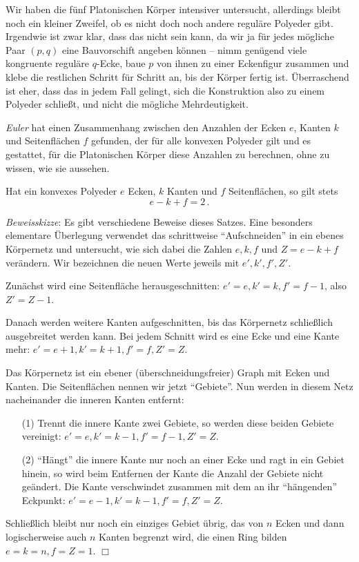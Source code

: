 \documentclass[11pt]{article}
\begin{document}
Wir haben die fünf Platonischen Körper intensiver untersucht, allerdings
bleibt noch ein kleiner Zweifel, ob es nicht doch noch andere reguläre
Polyeder gibt.  Irgendwie ist zwar klar, dass das nicht sein kann, da wir ja
für jedes mögliche Paar $(p,q)$ eine Bauvorschift angeben können -- nimm
genügend viele kongruente reguläre $q$-Ecke, baue $p$ von ihnen zu einer
Eckenfigur zusammen und klebe die restlichen Schritt für Schritt an, bis der
Körper fertig ist.  Überraschend ist eher, dass das in jedem Fall gelingt,
sich die Konstruktion also zu einem Polyeder schließt, und nicht die mögliche
Mehrdeutigkeit. 

\emph{Euler} hat einen Zusammenhang zwischen den Anzahlen der Ecken $e$,
Kanten $k$ und Seitenflächen $f$ gefunden, der für alle konvexen Polyeder gilt
und es gestattet, für die Platonischen Körper diese Anzahlen zu berechnen,
ohne zu wissen, wie sie aussehen.

\begin{satz}
Hat ein konvexes Polyeder $e$ Ecken, $k$ Kanten und $f$ Seitenflächen,
so gilt stets \[e-k+f=2\,.\]
\end{satz}

\emph{Beweisskizze}: Es gibt verschiedene Beweise dieses Satzes. Eine
besonders elementare Über\-legung verwendet das schrittweise
``Aufschneiden'' in ein ebenes Körpernetz und untersucht, wie sich
dabei die Zahlen $e,k,f$ und $Z=e-k+f$ verändern. Wir bezeichnen die
neuen Werte jeweils mit $e',k',f',Z'$.

Zunächst wird eine Seitenfläche herausgeschnitten: $e'=e, k'=k,
f'=f-1$, also $Z'=Z-1$.

Danach werden weitere Kanten aufgeschnitten, bis das Körpernetz
schließlich ausgebreitet werden kann. Bei jedem Schnitt wird es eine
Ecke und eine Kante mehr: $e'=e+1, k'=k+1, f'=f, Z'=Z$.

Das Körpernetz ist ein ebener (überschneidungsfreier) Graph mit Ecken
und Kanten. Die Seitenflächen nennen wir jetzt ``Gebiete''.  Nun
werden in diesem Netz nacheinander die inneren Kanten entfernt:
\begin{itemize}
\item[(1)] Trennt die innere Kante zwei Gebiete, so werden diese beiden
  Gebiete vereinigt: $e'=e, k'=k-1, f'=f-1, Z'=Z$.
\item [(2)] ``Hängt'' die innere Kante nur noch an einer Ecke und ragt
  in ein Gebiet hinein, so wird beim Entfernen der Kante die Anzahl
  der Gebiete nicht geändert. Die Kante verschwindet zusammen mit dem
  an ihr ``hängenden'' Eckpunkt: $e'=e-1,k'=k-1,f'=f, Z'=Z$.
\end{itemize}
Schließlich bleibt nur noch ein einziges Gebiet übrig, das von $n$
Ecken und dann logischerweise auch $n$ Kanten begrenzt wird, die einen
Ring bilden $e=k=n, f=Z=1$. $\Box$\medskip
\end{document}
